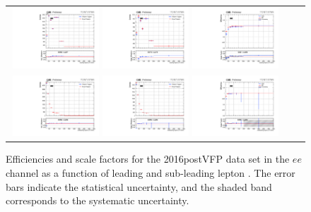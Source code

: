 \begin{figure}[h]
  \begin{center}
    \begin{tabular}{ccc}
      \includegraphics[width=0.32\textwidth]{fig_2016postVFP_TrigSF/g_lepApt_ee_MC.pdf}
      \includegraphics[width=0.32\textwidth]{fig_2016postVFP_TrigSF/g_lepApt_ee_data.pdf}
      \includegraphics[width=0.32\textwidth]{fig_2016postVFP_TrigSF/g_ee_lepApt_FullSystUncBand.pdf}\\
      \includegraphics[width=0.32\textwidth]{fig_2016postVFP_TrigSF/g_lepBpt_ee_MC.pdf}
      \includegraphics[width=0.32\textwidth]{fig_2016postVFP_TrigSF/g_lepBpt_ee_data.pdf}
      \includegraphics[width=0.32\textwidth]{fig_2016postVFP_TrigSF/g_ee_lepBpt_FullSystUncBand.pdf}\\
    \end{tabular}
    \caption{Efficiencies and scale factors for the 2016postVFP data set in the $ee$ channel as a function of leading and sub-leading lepton \pT.
            The error bars indicate the statistical uncertainty, and the shaded band corresponds to the systematic uncertainty.
            }
    \label{TrigSF_2016postVFP_2}
  \end{center}
\end{figure}

